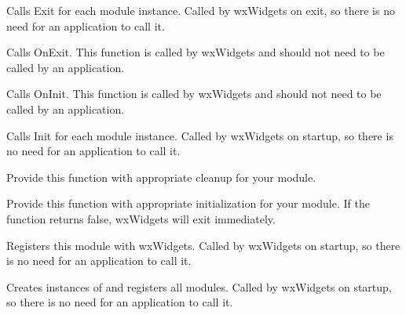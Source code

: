
Calls Exit for each module instance. Called by wxWidgets on exit, so there is no
need for an application to call it.

\label{wxmoduleexit}


Calls OnExit. This function is called by wxWidgets and should not need to be called
by an application.

\label{wxmoduleinit}


Calls OnInit. This function is called by wxWidgets and should not need to be called
by an application.

\label{wxmoduleinitializemodules}


Calls Init for each module instance. Called by wxWidgets on startup, so there is no
need for an application to call it.

\label{wxmoduleonexit}


Provide this function with appropriate cleanup for your module.

\label{wxmoduleoninit}


Provide this function with appropriate initialization for your module. If the function
returns false, wxWidgets will exit immediately.

\label{wxmoduleregistermodule}


Registers this module with wxWidgets. Called by wxWidgets on startup, so there is no
need for an application to call it.

\label{wxmoduleregistermodules}


Creates instances of and registers all modules. Called by wxWidgets on startup, so there is no
need for an application to call it.

